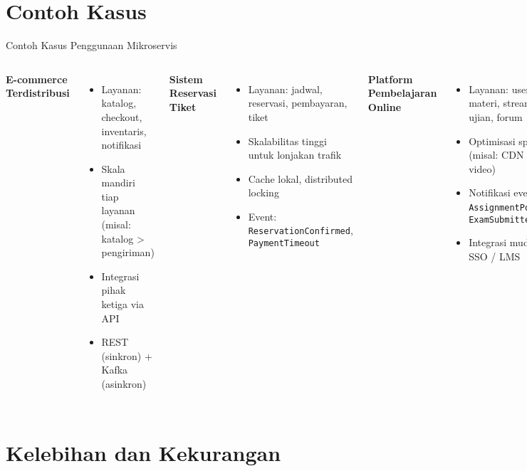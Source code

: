 \documentclass[aspectratio=169, table]{beamer}
\begin{document}
\section{Contoh Kasus}
\begin{frame}[fragile]{Contoh Kasus Penggunaan Mikroservis}
	\vspace{10pt}
	\begin{columns}[T]
		\textbf{E-commerce Terdistribusi}
		\begin{itemize}
			\item Layanan: katalog, checkout, inventaris, notifikasi
			\item Skala mandiri tiap layanan (misal: katalog > pengiriman)
			\item Integrasi pihak ketiga via API
			\item REST (sinkron) + Kafka (asinkron)
		\end{itemize}
		
		\textbf{Sistem Reservasi Tiket}
		\begin{itemize}
			\item Layanan: jadwal, reservasi, pembayaran, tiket
			\item Skalabilitas tinggi untuk lonjakan trafik
			\item Cache lokal, distributed locking
			\item Event: \texttt{ReservationConfirmed}, \texttt{PaymentTimeout}
		\end{itemize}
		
		\textbf{Platform Pembelajaran Online}
		\begin{itemize}
			\item Layanan: user, materi, streaming, ujian, forum
			\item Optimisasi spesifik (misal: CDN untuk video)
			\item Notifikasi event: \texttt{AssignmentPosted}, \texttt{ExamSubmitted}
			\item Integrasi mudah ke SSO / LMS
		\end{itemize}
	\end{columns}
\end{frame}

\section{Kelebihan dan Kekurangan}
\end{document}
